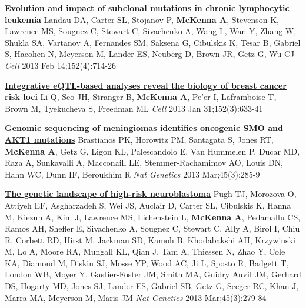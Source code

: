 \documentclass[9pt]{article}
\begin{document}
\noindent\href{https://www.ncbi.nlm.nih.gov/pubmed/23415222}{\bf  Evolution and impact of subclonal mutations in chronic lymphocytic leukemia}\vspace{-0.03in}
\newline\noindent Landau DA, Carter SL, Stojanov P, \textbf{McKenna A}, Stevenson K, Lawrence MS, Sougnez C, Stewart C, Sivachenko A, Wang L, Wan Y, Zhang W, Shukla SA, Vartanov A, Fernandes SM, Saksena G, Cibulskis K, Tesar B, Gabriel S, Hacohen N, Meyerson  M, Lander ES, Neuberg D, Brown JR, Getz G, Wu CJ
\newline\noindent\emph{ Cell} 2013 Feb 14;152(4):714-26
\bigskip

\noindent\href{https://www.ncbi.nlm.nih.gov/pubmed/23374354}{\bf  Integrative eQTL-based analyses reveal the biology of  breast cancer risk loci}\vspace{-0.03in}
\newline\noindent Li Q, Seo JH, Stranger B, \textbf{McKenna A}, Pe'er I, Laframboise T, Brown M, Tyekucheva S, Freedman ML
\newline\noindent\emph{ Cell} 2013 Jan 31;152(3):633-41
\bigskip

\noindent\href{https://www.ncbi.nlm.nih.gov/pubmed/23334667}{\bf  Genomic sequencing of meningiomas identifies oncogenic SMO and AKT1 mutations}\vspace{-0.03in}
\newline\noindent Brastianos PK, Horowitz PM, Santagata S, Jones RT, \textbf{McKenna A}, Getz G, Ligon KL, Palescandolo E, Van Hummelen P, Ducar MD, Raza A, Sunkavalli A, Macconaill LE, Stemmer-Rachamimov AO, Louis DN, Hahn WC, Dunn IF, Beroukhim R
\newline\noindent\emph{ Nat Genetics} 2013 Mar;45(3):285-9
\bigskip

\noindent\href{https://www.ncbi.nlm.nih.gov/pubmed/23334666}{\bf  The genetic landscape of high-risk neuroblastoma}\vspace{-0.03in}
\newline\noindent Pugh TJ, Morozova O, Attiyeh EF, Asgharzadeh S, Wei JS, Auclair D, Carter SL, Cibulskis K, Hanna M, Kiezun A, Kim J, Lawrence MS, Lichenstein L, \textbf{McKenna A}, Pedamallu CS, Ramos AH, Shefler E, Sivachenko A, Sougnez C, Stewart C, Ally A, Birol I, Chiu R, Corbett RD, Hirst M, Jackman SD, Kamoh B, Khodabakshi AH, Krzywinski M, Lo A, Moore RA, Mungall KL, Qian J, Tam A, Thiessen N, Zhao Y, Cole KA, Diamond M, Diskin SJ, Mosse YP, Wood AC, Ji L, Sposto R, Badgett T, London WB, Moyer Y, Gastier-Foster JM, Smith MA, Guidry Auvil JM, Gerhard DS, Hogarty MD, Jones SJ, Lander ES, Gabriel SB, Getz G, Seeger RC, Khan J, Marra MA, Meyerson M, Maris JM
\newline\noindent\emph{ Nat Genetics} 2013 Mar;45(3):279-84
\bigskip
\end{document}
